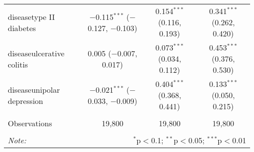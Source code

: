 \begin{table}[!htbp]
\begin{tabular}{@{\extracolsep{5pt}}lccc}
  diseasetype II diabetes & $-$0.115$^{***}$ ($-$0.127, $-$0.103) & 0.154$^{***}$ (0.116, 0.193) & 0.341$^{***}$ (0.262, 0.420) \\ 
  diseaseulcerative colitis & 0.005 ($-$0.007, 0.017) & 0.073$^{***}$ (0.034, 0.112) & 0.453$^{***}$ (0.376, 0.530) \\ 
  diseaseunipolar depression & $-$0.021$^{***}$ ($-$0.033, $-$0.009) & 0.404$^{***}$ (0.368, 0.441) & 0.133$^{***}$ (0.050, 0.215) \\ 
 \hline \\[-1.8ex] 
Observations & 19,800 & 19,800 & 19,800 \\ 
\hline 
\hline \\[-1.8ex] 
\textit{Note:}  & \multicolumn{3}{r}{$^{*}$p$<$0.1; $^{**}$p$<$0.05; $^{***}$p$<$0.01} \\ 
\end{tabular} 
\end{table} 
